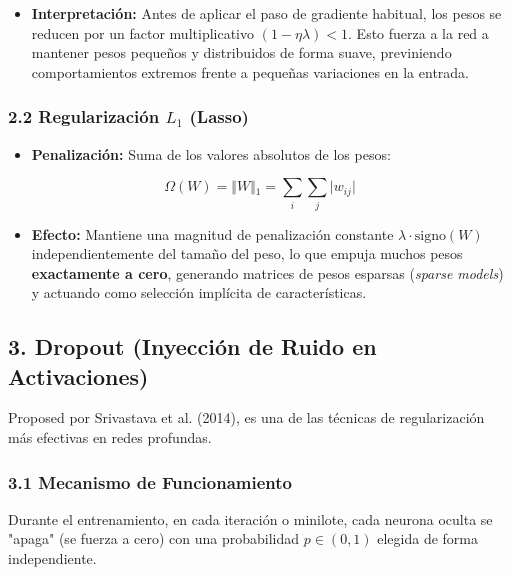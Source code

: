 \documentclass[11pt,oneside]{article}
\begin{document}
\begin{itemize}

\item \textbf{Interpretación:} Antes de aplicar el paso de gradiente habitual, los pesos se reducen por un factor multiplicativo \((1 - \eta \lambda) < 1\). Esto fuerza a la red a mantener pesos pequeños y distribuidos de forma suave, previniendo comportamientos extremos frente a pequeñas variaciones en la entrada.

\end{itemize}

\subsubsection{2.2 Regularización \(L_1\) (Lasso)}

\begin{itemize}

\item \textbf{Penalización:} Suma de los valores absolutos de los pesos:

\end{itemize}

\[\Omega(W) = \Vert{}W\Vert{}_1 = \sum_{i} \sum_{j} \vert{}w_{ij}\vert{}\]

\begin{itemize}

\item \textbf{Efecto:} Mantiene una magnitud de penalización constante \(\lambda \cdot \text{signo}(W)\) independientemente del tamaño del peso, lo que empuja muchos pesos \textbf{exactamente a cero}, generando matrices de pesos esparsas (\emph{sparse models}) y actuando como selección implícita de características.

\end{itemize}

\subsection{3. Dropout (Inyección de Ruido en Activaciones)}

Proposed por Srivastava et al. (2014), es una de las técnicas de regularización más efectivas en redes profundas.

\subsubsection{3.1 Mecanismo de Funcionamiento}

Durante el entrenamiento, en cada iteración o minilote, cada neurona oculta se "apaga" (se fuerza a cero) con una probabilidad \(p \in (0, 1)\) elegida de forma independiente.
\end{document}
